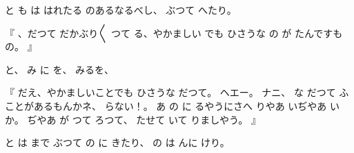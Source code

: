 と
も
は
はれたる
のあるなるべし、
ぶつて
へたり。

『
、だつて
だかぶり〳〵
つて
る、やかましい
でも
ひさうな
の
が
たんですもの。
』

と、
み
に
を、
みるを、

『
だえ、やかましいことでも
ひさうな
だつて。
ヘエー。
ナニ、
な
だつて
ふことがあるもんかネ、
らない！。
あ
の
に
るやうにさへ
りやあ
いぢやあ
いか。
ぢやあ
が
つて
ろつて、
たせて
いて
りましやう。
』

と
は
まで
ぶつて
の
に
きたり、
の
は
んに
けり。

